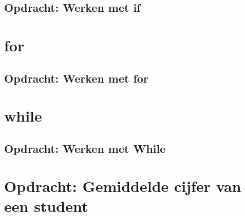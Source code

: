 \documentclass[a4paper,12pt,twoside,openright,titlepage]{book}
\begin{document}
\subsection{Opdracht: Werken met if}

\section{for}

\subsection{Opdracht: Werken met for}

\section{while}

\subsection{Opdracht: Werken met While}

\section{Opdracht: Gemiddelde cijfer van een student}


\backmatter
\printindex
\end{document}

